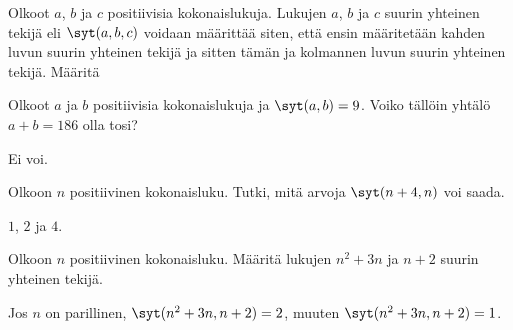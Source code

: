 \begin{tehtava}
    Olkoot $a$, $b$ ja $c$ positiivisia kokonaislukuja. Lukujen $a$, $b$ ja $c$ suurin yhteinen tekijä eli $\syt(a, b, c)$ voidaan määrittää siten, että ensin määritetään kahden luvun suurin yhteinen tekijä ja sitten tämän ja kolmannen luvun suurin yhteinen tekijä. Määritä
    
    \begin{alakohdat}
    \end{alakohdat}

    \begin{vastaus}
        \begin{alakohdat}
        \end{alakohdat}
    \end{vastaus}
    
\end{tehtava}

\begin{tehtava}
    Olkoot $a$ ja $b$ positiivisia kokonaislukuja ja $\syt(a, b)=9$. Voiko tällöin yhtälö $a + b = 186$ olla tosi?
    
    \begin{vastaus}
        Ei voi.
    \end{vastaus}
    
\end{tehtava}

\begin{tehtava}
    Olkoon $n$ positiivinen kokonaisluku. Tutki, mitä arvoja $\syt(n+4, n)$ voi saada.
    
    \begin{vastaus}
        $1$, $2$ ja $4$.
    \end{vastaus}
    
\end{tehtava}

\begin{tehtava}
    Olkoon $n$ positiivinen kokonaisluku. Määritä lukujen $n^2 + 3n$ ja $n + 2$ suurin yhteinen tekijä.
    
    \begin{vastaus}
        Jos $n$ on parillinen, $\syt(n^2 + 3n, n + 2) = 2$, muuten $\syt(n^2 + 3n, n + 2) = 1$.
    \end{vastaus}
    
\end{tehtava}

